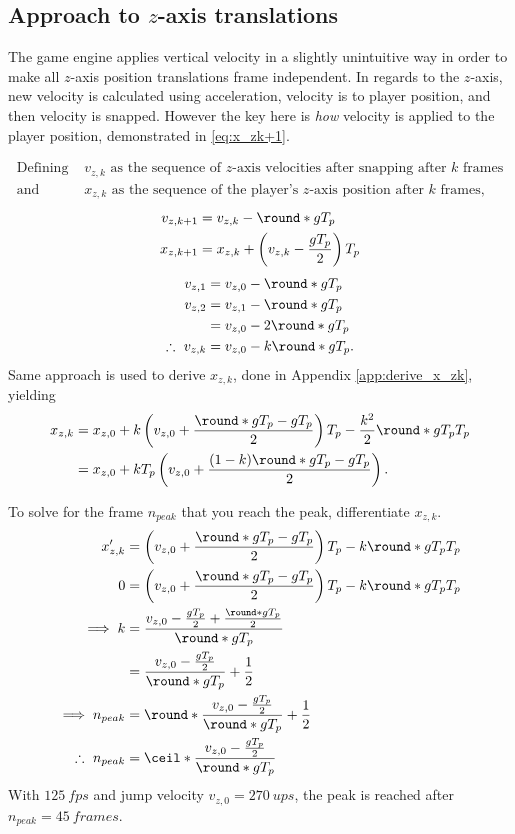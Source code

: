 \subsection{Approach to $z$-axis translations}
\label{sec:x_z}
The game engine applies vertical velocity in a slightly unintuitive way in order to make all $z$-axis position translations frame independent.
In regards to the $z$-axis, new velocity is calculated using acceleration, velocity is to player position, and then velocity is snapped.
However the key here is \emph{how} velocity is applied to the player position, demonstrated in \eqref{eq:x_zk+1}.

\begin{align*}
\text{Defining }&v_{z,k}\text{ as the sequence of $z$-axis velocities after snapping after $k$ frames}\\
\text{and }&x_{z,k}\text{ as the sequence of the player's $z$-axis position after $k$ frames},
\end{align*}
\begin{align}
\label{eq:v_zk+1}
v_{z,k+1} &= v_{z,k} - \round*{gT_p}\\
\label{eq:x_zk+1}
x_{z,k+1} &= x_{z,k} + \left(v_{z,k} - \frac{gT_p}{2} \right) T_p
\end{align}
\begin{align}
\nonumber
v_{z,1} &= v_{z,0} - \round*{gT_p}\\\nonumber
v_{z,2} &= v_{z,1} - \round*{gT_p}\\\nonumber
&= v_{z,0} - 2\round*{gT_p}\\
\label{eq:v_zk}
\therefore\ v_{z,k} &= v_{z,0} - k\round*{gT_p}.
\end{align}
Same approach is used to derive $x_{z,k}$, done in Appendix \ref{app:derive_x_zk}, yielding
\begin{align}
\label{eq:x_zk}
x_{z,k} &= x_{z,0} + k\left(v_{z,0} + \frac{\round*{gT_p} - gT_p}{2} \right) T_p - \frac{k^2}{2} \round*{gT_p} T_p\\\nonumber
&= x_{z,0} + kT_p\left(v_{z,0} + \frac{(1 - k)\round*{gT_p} - gT_p}{2} \right).
\end{align}

To solve for the frame $n_{peak}$ that you reach the peak, differentiate $x_{z,k}$.
\begin{align}
\nonumber
x_{z,k}' &= \left(v_{z,0} + \frac{\round*{gT_p} - gT_p}{2} \right) T_p - k\round*{gT_p} T_p\\\nonumber
0 &= \left(v_{z,0} + \frac{\round*{gT_p} - gT_p}{2} \right) T_p - k\round*{gT_p} T_p\\\nonumber
\implies k &= \frac{v_{z,0} - \frac{gT_p}{2} + \frac{\round*{gT_p}}{2}}{\round*{gT_p}}\\\nonumber
&= \frac{v_{z,0} - \frac{gT_p}{2}}{\round*{gT_p}} + \frac{1}{2}\\\nonumber
\implies n_{peak} &= \round*{\frac{v_{z,0} - \frac{gT_p}{2}}{\round*{gT_p}} + \frac{1}{2}}\\
\therefore\ n_{peak} &= \ceil*{\frac{v_{z,0} - \frac{gT_p}{2}}{\round*{gT_p}}}
\end{align}
With $\qty{125}{fps}$ and jump velocity $v_{z,0} = \qty{270}{ups}$, the peak is reached after $n_{peak} = \qty{45}{frames}$.\\

